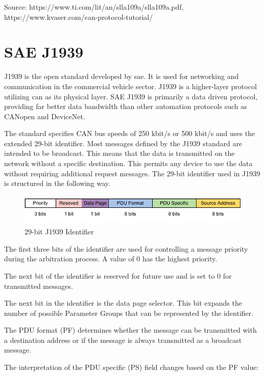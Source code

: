 Source: https://www.ti.com/lit/an/slla109a/slla109a.pdf,
https://www.kvaser.com/can-protocol-tutorial/

\section{SAE J1939}
J1939 is the open standard developed by \acrfull{sae}. It is used for networking and communication in the commercial vehicle sector. J1939 is a higher-layer protocol utilizing \acrshort{can} as its physical layer. SAE J1939 is primarily a data driven protocol, providing far better data bandwidth than other automation protocols such as CANopen and DeviceNet. 

The standard specifies CAN bus speeds of 250 kbit/s or 500 kbit/s and uses the extended 29-bit identifier. Most messages defined by the J1939 standard are intended to be broadcast. This means that the data is transmitted on the network without a specific destination. This permits any device to use the data without requiring additional request messages. The 29-bit identifier used in J1939 is structured in the following way.

\begin{figure}[h!]
	\centering
	\includegraphics[height=1.5cm]{images/j1939-identifier}
	\caption{29-bit J1939 Identifier}
	\vspace{-1.4ex}
	\label{fig:can-bus_topology}
\end{figure}

The first three bits of the identifier are used for controlling a message priority during the arbitration process. A value of 0 has the highest priority.

The next bit of the identifier is reserved for future use and is set to 0 for transmitted messages.

The next bit in the identifier is the data page selector. This bit expands the number of possible Parameter Groups that can be represented by the identifier.

The PDU format (PF) determines whether the message can be transmitted with a destination address or if the message is always transmitted as a broadcast message.

The interpretation of the PDU specific (PS) field changes based on the PF value:

